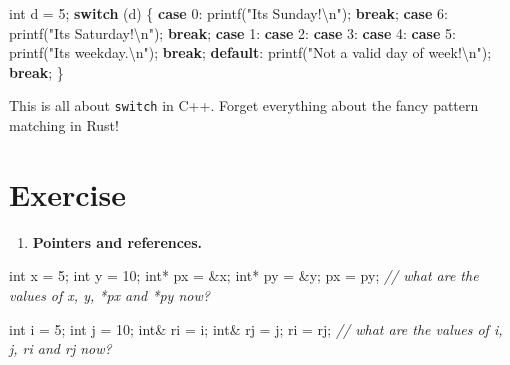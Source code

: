 \documentclass[
]{book}
\newenvironment{Shaded}{\begin{snugshade}}{\end{snugshade}}
\newcommand{\CommentTok}[1]{\textcolor[rgb]{0.56,0.35,0.01}{\textit{#1}}}
\newcommand{\ControlFlowTok}[1]{\textcolor[rgb]{0.13,0.29,0.53}{\textbf{#1}}}
\newcommand{\DataTypeTok}[1]{\textcolor[rgb]{0.13,0.29,0.53}{#1}}
\newcommand{\DecValTok}[1]{\textcolor[rgb]{0.00,0.00,0.81}{#1}}
\newcommand{\NormalTok}[1]{#1}
\newcommand{\SpecialCharTok}[1]{\textcolor[rgb]{0.00,0.00,0.00}{#1}}
\newcommand{\StringTok}[1]{\textcolor[rgb]{0.31,0.60,0.02}{#1}}
\providecommand{\tightlist}{%
  \setlength{\itemsep}{0pt}\setlength{\parskip}{0pt}}
\begin{document}
\begin{Shaded}
\begin{Highlighting}[]
\DataTypeTok{int}\NormalTok{ d = }\DecValTok{5}\NormalTok{;}
\ControlFlowTok{switch}\NormalTok{ (d)}
\NormalTok{\{}
\ControlFlowTok{case} \DecValTok{0}\NormalTok{:}
\NormalTok{    printf(}\StringTok{"It\textquotesingle{}s Sunday!}\SpecialCharTok{\textbackslash{}n}\StringTok{"}\NormalTok{);}
    \ControlFlowTok{break}\NormalTok{;}
\ControlFlowTok{case} \DecValTok{6}\NormalTok{:}
\NormalTok{    printf(}\StringTok{"It\textquotesingle{}s Saturday!}\SpecialCharTok{\textbackslash{}n}\StringTok{"}\NormalTok{);}
    \ControlFlowTok{break}\NormalTok{;}
\ControlFlowTok{case} \DecValTok{1}\NormalTok{:}
\ControlFlowTok{case} \DecValTok{2}\NormalTok{:}
\ControlFlowTok{case} \DecValTok{3}\NormalTok{:}
\ControlFlowTok{case} \DecValTok{4}\NormalTok{:}
\ControlFlowTok{case} \DecValTok{5}\NormalTok{:}
\NormalTok{    printf(}\StringTok{"It\textquotesingle{}s weekday.}\SpecialCharTok{\textbackslash{}n}\StringTok{"}\NormalTok{);}
    \ControlFlowTok{break}\NormalTok{;}
\ControlFlowTok{default}\NormalTok{:}
\NormalTok{    printf(}\StringTok{"Not a valid day of week!}\SpecialCharTok{\textbackslash{}n}\StringTok{"}\NormalTok{);}
    \ControlFlowTok{break}\NormalTok{;}
\NormalTok{\}}
\end{Highlighting}
\end{Shaded}

This is all about \texttt{switch} in C++. Forget everything about the fancy pattern matching in Rust!

\hypertarget{exercise}{%
\section*{Exercise}\label{exercise}}

\begin{enumerate}
\def\labelenumi{\arabic{enumi}.}
\tightlist
\item
  \textbf{Pointers and references.}
\end{enumerate}

\begin{Shaded}
\begin{Highlighting}[]
\DataTypeTok{int}\NormalTok{ x = }\DecValTok{5}\NormalTok{;}
\DataTypeTok{int}\NormalTok{ y = }\DecValTok{10}\NormalTok{;}
\DataTypeTok{int}\NormalTok{* px = \&x;}
\DataTypeTok{int}\NormalTok{* py = \&y;}
\NormalTok{px = py;}
\CommentTok{// what are the values of x, y, *px and *py now?}

\DataTypeTok{int}\NormalTok{ i = }\DecValTok{5}\NormalTok{;}
\DataTypeTok{int}\NormalTok{ j = }\DecValTok{10}\NormalTok{;}
\DataTypeTok{int}\NormalTok{\& ri = i;}
\DataTypeTok{int}\NormalTok{\& rj = j;}
\NormalTok{ri = rj;}
\CommentTok{// what are the values of i, j, ri and rj now?}
\end{Highlighting}
\end{Shaded}


  
\end{document}

